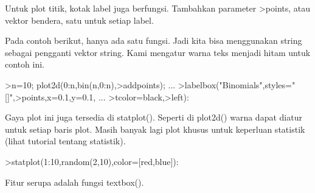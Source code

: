 \documentclass[a4paper,10pt]{article}
\begin{document}
\begin{eulernotebook}
\begin{eulercomment}
\begin{eulercomment}
\begin{eulercomment}
\begin{eulercomment}
\begin{eulercomment}
\begin{eulercomment}
\begin{eulercomment}
\begin{eulercomment}
\begin{eulercomment}
\begin{eulercomment}
\begin{eulercomment}
\begin{eulercomment}
\begin{eulercomment}
\begin{eulercomment}
\begin{eulercomment}
\begin{eulercomment}
\begin{eulercomment}
\begin{eulercomment}
\begin{eulercomment}
\begin{eulercomment}
\begin{eulercomment}
\begin{eulercomment}
\begin{eulercomment}
\begin{eulercomment}
\begin{eulercomment}
\begin{eulercomment}
\begin{eulercomment}
\begin{eulercomment}
\begin{eulercomment}
\begin{eulercomment}
\begin{eulercomment}
\begin{eulercomment}
\begin{eulercomment}
\begin{eulercomment}
\begin{eulercomment}
\begin{eulercomment}
\begin{eulercomment}
Untuk plot titik, kotak label juga berfungsi. Tambahkan parameter
\textgreater{}points, atau vektor bendera, satu untuk setiap label.

Pada contoh berikut, hanya ada satu fungsi. Jadi kita bisa menggunakan
string sebagai pengganti vektor string. Kami mengatur warna teks
menjadi hitam untuk contoh ini.
\end{eulercomment}
\begin{eulerprompt}
>n=10; plot2d(0:n,bin(n,0:n),>addpoints); ...
>labelbox("Binomials",styles="[]",>points,x=0.1,y=0.1, ...
>tcolor=black,>left):
\end{eulerprompt}
\begin{eulercomment}
Gaya plot ini juga tersedia di statplot(). Seperti di plot2d() warna
dapat diatur untuk setiap baris plot. Masih banyak lagi plot khusus
untuk keperluan statistik (lihat tutorial tentang statistik).
\end{eulercomment}
\begin{eulerprompt}
>statplot(1:10,random(2,10),color=[red,blue]):
\end{eulerprompt}
\begin{eulercomment}
Fitur serupa adalah fungsi textbox().


\end{eulercomment}
\end{eulercomment}
\end{eulercomment}
\end{eulercomment}
\end{eulercomment}
\end{eulercomment}
\end{eulercomment}
\end{eulercomment}
\end{eulercomment}
\end{eulercomment}
\end{eulercomment}
\end{eulercomment}
\end{eulercomment}
\end{eulercomment}
\end{eulercomment}
\end{eulercomment}
\end{eulercomment}
\end{eulercomment}
\end{eulercomment}
\end{eulercomment}
\end{eulercomment}
\end{eulercomment}
\end{eulercomment}
\end{eulercomment}
\end{eulercomment}
\end{eulercomment}
\end{eulercomment}
\end{eulercomment}
\end{eulercomment}
\end{eulercomment}
\end{eulercomment}
\end{eulercomment}
\end{eulercomment}
\end{eulercomment}
\end{eulercomment}
\end{eulercomment}
\end{eulercomment}
\end{eulernotebook}
\end{document}
